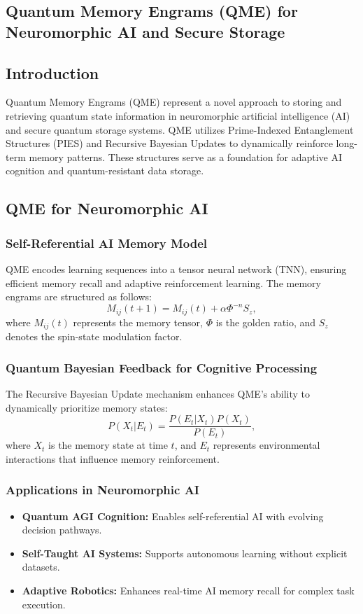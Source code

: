 \documentclass{article}
\theoremstyle{plain}
\begin{document}
\begin{itemize}
\begin{itemize}
\section{Quantum Memory Engrams (QME) for Neuromorphic AI and Secure Storage}

\subsection{Introduction}
Quantum Memory Engrams (QME) represent a novel approach to storing and retrieving quantum state information in neuromorphic artificial intelligence (AI) and secure quantum storage systems. QME utilizes Prime-Indexed Entanglement Structures (PIES) and Recursive Bayesian Updates to dynamically reinforce long-term memory patterns. These structures serve as a foundation for adaptive AI cognition and quantum-resistant data storage.

\subsection{QME for Neuromorphic AI}
\subsubsection{Self-Referential AI Memory Model}
QME encodes learning sequences into a tensor neural network (TNN), ensuring efficient memory recall and adaptive reinforcement learning. The memory engrams are structured as follows:
\begin{equation}
M_{ij}(t+1) = M_{ij}(t) + \alpha \Phi^{-n} S_z,
\end{equation}
where $M_{ij}(t)$ represents the memory tensor, $\Phi$ is the golden ratio, and $S_z$ denotes the spin-state modulation factor.

\subsubsection{Quantum Bayesian Feedback for Cognitive Processing}
The Recursive Bayesian Update mechanism enhances QME’s ability to dynamically prioritize memory states:
\begin{equation}
P(X_t | E_t) = \frac{P(E_t | X_t) P(X_t)}{P(E_t)},
\end{equation}
where $X_t$ is the memory state at time $t$, and $E_t$ represents environmental interactions that influence memory reinforcement.

\subsubsection{Applications in Neuromorphic AI}
\begin{itemize}
    \item \textbf{Quantum AGI Cognition:} Enables self-referential AI with evolving decision pathways.
    \item \textbf{Self-Taught AI Systems:} Supports autonomous learning without explicit datasets.
    \item \textbf{Adaptive Robotics:} Enhances real-time AI memory recall for complex task execution.
\end{itemize}


\end{itemize}
\end{itemize}
\end{document}
